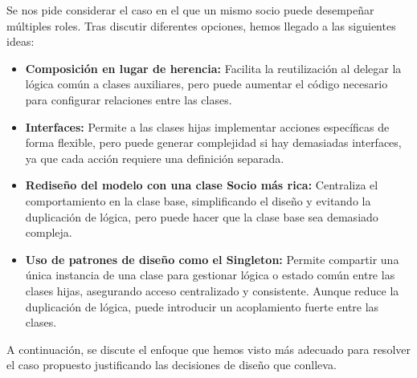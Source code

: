 
Se nos pide considerar el caso en el que un mismo socio puede desempeñar 
múltiples roles. Tras discutir diferentes opciones, hemos llegado a las siguientes ideas:

\begin{itemize}
    \item \textbf{Composición en lugar de herencia:} 
    Facilita la reutilización al delegar la lógica común a clases auxiliares,
    pero puede aumentar el código necesario para configurar relaciones entre las clases.
    \item \textbf{Interfaces:} 
    Permite a las clases hijas implementar acciones específicas de forma flexible,
    pero puede generar complejidad si hay demasiadas interfaces, ya que cada acción
    requiere una definición separada.
    \item \textbf{Rediseño del modelo con una clase Socio más rica:}
    Centraliza el comportamiento en la clase base, simplificando el diseño y
    evitando la duplicación de lógica, pero puede hacer que la clase base sea
    demasiado compleja.
    \item \textbf{Uso de patrones de diseño como el Singleton:}
    Permite compartir una única instancia de una clase para gestionar lógica o
    estado común entre las clases hijas, asegurando acceso centralizado y consistente.
    Aunque reduce la duplicación de lógica, puede introducir un acoplamiento fuerte
    entre las clases.
\end{itemize}

A continuación, se discute el enfoque que hemos visto más adecuado para resolver 
el caso propuesto justificando las decisiones de diseño que conlleva.

\newpage
